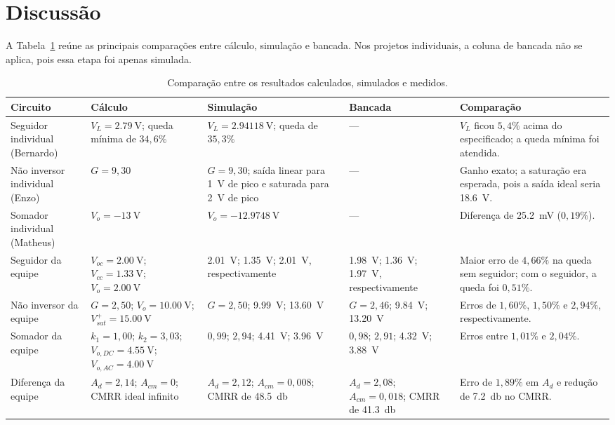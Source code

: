 \documentclass[11pt,a4paper]{article}
\begin{document}
\section{Discussão}

A Tabela~\ref{tab:comparacao_resultados} reúne as principais comparações entre cálculo, simulação e bancada. Nos projetos individuais, a coluna de bancada não se aplica, pois essa etapa foi apenas simulada.

\begin{table}[htbp]
\centering
\caption{Comparação entre os resultados calculados, simulados e medidos.}
\label{tab:comparacao_resultados}
\footnotesize
\renewcommand{\arraystretch}{1.12}
\begin{tabular}{@{}p{2.4cm}p{2.7cm}p{2.7cm}p{2.7cm}p{3.0cm}@{}}
\toprule
\textbf{Circuito} & \textbf{Cálculo} & \textbf{Simulação} & \textbf{Bancada} & \textbf{Comparação} \\
\midrule
Seguidor individual (Bernardo) & $V_L=\SI{2,79}{\volt}$; queda mínima de $34,6\%$ & $V_L=\SI{2,94118}{\volt}$; queda de $35,3\%$ & --- & $V_L$ ficou $5,4\%$ acima do especificado; a queda mínima foi atendida. \\

Não inversor individual (Enzo) & $G=9,30$ & $G=9,30$; saída linear para \SI{1}{\volt} de pico e saturada para \SI{2}{\volt} de pico & --- & Ganho exato; a saturação era esperada, pois a saída ideal seria \SI{18,6}{\volt}. \\

Somador individual (Matheus) & $V_o=\SI{-13}{\volt}$ & $V_o=\SI{-12,9748}{\volt}$ & --- & Diferença de \SI{25,2}{\milli\volt} ($0,19\%$). \\

Seguidor da equipe & $V_{oc}=\SI{2,00}{\volt}$; $V_{cc}=\SI{1,33}{\volt}$; $V_o=\SI{2,00}{\volt}$ & \SI{2,01}{\volt}; \SI{1,35}{\volt}; \SI{2,01}{\volt}, respectivamente & \SI{1,98}{\volt}; \SI{1,36}{\volt}; \SI{1,97}{\volt}, respectivamente & Maior erro de $4,66\%$ na queda sem seguidor; com o seguidor, a queda foi $0,51\%$. \\

Não inversor da equipe & $G=2,50$; $V_o=\SI{10,00}{\volt}$; $V_{sat}^{+}=\SI{15,00}{\volt}$ & $G=2,50$; \SI{9,99}{\volt}; \SI{13,60}{\volt} & $G=2,46$; \SI{9,84}{\volt}; \SI{13,20}{\volt} & Erros de $1,60\%$, $1,50\%$ e $2,94\%$, respectivamente. \\

Somador da equipe & $k_1=1,00$; $k_2=3,03$; $V_{o,DC}=\SI{4,55}{\volt}$; $V_{o,AC}=\SI{4,00}{\volt}$ & $0,99$; $2,94$; \SI{4,41}{\volt}; \SI{3,96}{\volt} & $0,98$; $2,91$; \SI{4,32}{\volt}; \SI{3,88}{\volt} & Erros entre $1,01\%$ e $2,04\%$. \\

Diferença da equipe & $A_d=2,14$; $A_{cm}=0$; CMRR ideal infinito & $A_d=2,12$; $A_{cm}=0,008$; CMRR de \SI{48,5}{\decibel} & $A_d=2,08$; $A_{cm}=0,018$; CMRR de \SI{41,3}{\decibel} & Erro de $1,89\%$ em $A_d$ e redução de \SI{7,2}{\decibel} no CMRR. \\
\bottomrule
\end{tabular}
\end{table}
\end{document}
